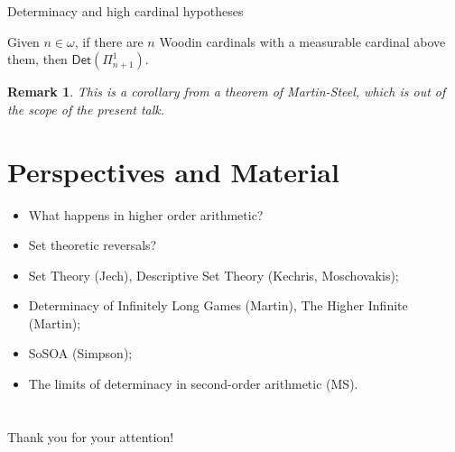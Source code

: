\documentclass{beamer} %
\newtheorem{remark}[theorem]{Remark}
\begin{document}

\begin{frame}{Determinacy and high cardinal hypotheses}
    \begin{theorem}
        Given $n \in \omega$, if there are $n$ Woodin cardinals with a measurable cardinal above 
        them, then $\mathsf{Det}(\Pi^1_{n+1})$.
    \end{theorem}

    \begin{remark}
        This is a corollary from a theorem of Martin-Steel, which is out of the scope of the 
        present talk.
    \end{remark} 
\end{frame}


\section{Perspectives and Material}

\begin{frame}
    \begin{itemize}
        \item<1-> What happens in higher order arithmetic?
        \item<2-> Set theoretic reversals?
        \item<3-> Set Theory (Jech), Descriptive Set Theory (Kechris, Moschovakis);
        \item<4-> Determinacy of Infinitely Long Games (Martin), The Higher Infinite (Martin);
        \item<5-> SoSOA (Simpson);
        \item<6-> The limits of determinacy in second-order arithmetic (MS).
    \end{itemize}
\end{frame}


\section*{}
\begin{frame}
    \huge{Thank you for your attention!}
\end{frame}
\end{document}
